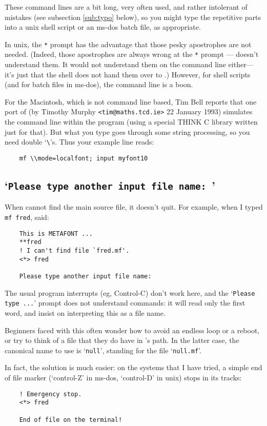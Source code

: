 These command lines are a bit long, very often used, and rather
intolerant of mistakes (see subsection \ref{sub:typo} below),
so you might type the repetitive parts into a {\sc unix} shell script
or an {\sc ms-dos} batch file, as appropriate.

In {\sc unix}, the {\tt **} prompt has the advantage that those pesky
apostrophes are not needed.  (Indeed, those apostrophes are always
wrong at the {\tt **} prompt --- \MF{} doesn't understand them.
It would not understand them on the command line either---it's just
that the shell does not hand them over to \MF{}.)
However, for shell scripts (and for batch files in {\sc ms-dos}),
the command line is a boon.

For the Macintosh, which is not command line based,
Tim {\sc Bell} reports that one port of \MF{}
(by Timothy {\sc Murphy\/} {\tt <tim@maths.tcd.ie>} 22 January 1993)
simulates the command line within the program
(using a special THINK C library written just for that).
But what you type goes through some string processing,
so you need double `\verb+\+'s.
Thus your example line reads:
\begin{verbatim}
    mf \\mode=localfont; input myfont10
\end{verbatim}


\subsection{`{\tt Please type another input file name: }'}%
\label{sub:another}

When \MF{} cannot find the main source file, it doesn't quit.
For example, when I typed {\tt mf fred}, \MF{} said:
\begin{verbatim}
    This is METAFONT ...
    **fred
    ! I can't find file `fred.mf'.
    <*> fred

    Please type another input file name:
\end{verbatim}
The usual program interrupts (eg, Control-C) don't work here,
and the `{\tt Please type ...}' prompt does not understand
\MF{} commands:  it will read only the first word, and insist on
interpreting this as a file name.

Beginners faced with this often wonder how to avoid an endless loop
or a reboot, or try to think of a \MF{} file that they do have
in \MF{}'s path.  In the latter case, the canonical name to use
is `{\tt null}', standing for the file `{\tt null.mf}'.

In fact, the solution is much easier:  on the
systems that I have tried, a simple end of file marker
(`control-Z' in {\sc ms-dos}, `control-D' in {\sc unix})
stops \MF{} in its tracks:
\begin{verbatim}
    ! Emergency stop.
    <*> fred

    End of file on the terminal!
\end{verbatim}


